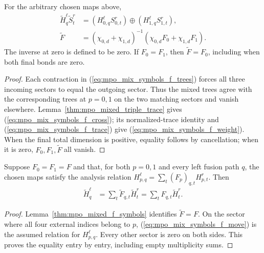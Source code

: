 \begin{lemma}
    \label{thm:mpo_mixed_f_symbols}
    \leanok
    For the arbitrary chosen maps above,
    \begin{align}
        \widetilde H^\ell_q\widetilde S^r_t
         & =(H^\ell_{0,q}S^r_{0,t})\oplus(H^\ell_{1,q}S^r_{1,t}),
        \label{eq:mpo_mix_symbols_f_cross}                        \\
        \widetilde F
         & =(\chi_{0,d}+\chi_{1,d})^{-1}
        (\chi_{0,d}F_0+\chi_{1,d}F_1).
        \label{eq:mpo_mix_symbols_f_weight}
    \end{align}
    The inverse at zero is defined to be zero. If $F_0=F_1$, then
    $\widetilde F=F_0$, including when both final bonds are zero.
\end{lemma}
\begin{proof}
    \leanok
    Each contraction in (\ref{eq:mpo_mix_symbols_f_trees}) forces
    all three incoming sectors to equal the outgoing sector. Thus
    the mixed trees agree with the corresponding trees at $p=0,1$
    on the two matching sectors and vanish elsewhere.
    Lemma~\ref{thm:mpo_mixed_triple_trace} gives
    (\ref{eq:mpo_mix_symbols_f_cross}); its normalized-trace
    identity and (\ref{eq:mpo_mix_symbols_f_trace}) give
    (\ref{eq:mpo_mix_symbols_f_weight}). When the final total
    dimension is positive, equality follows by cancellation; when it
    is zero, $F_0,F_1,\widetilde F$ all vanish.
\end{proof}

\begin{lemma}
    \label{thm:mpo_mixed_f_move}
    \leanok
    Suppose $F_0=F_1=F$ and that, for both $p=0,1$ and every left
    fusion path $q$, the chosen maps satisfy the analysis relation
    $H^\ell_{p,q}=\sum_t(F_p)_{q,t}H^r_{p,t}$. Then
    \begin{align}
        \widetilde H^\ell_q
         & =\sum_t\widetilde F_{q,t}\widetilde H^r_t
        =\sum_tF_{q,t}\widetilde H^r_t.
        \label{eq:mpo_mix_symbols_f_move}
    \end{align}
\end{lemma}
\begin{proof}
    \leanok
    Lemma~\ref{thm:mpo_mixed_f_symbols} identifies
    $\widetilde F=F$. On the sector where all four external indices
    belong to $p$, (\ref{eq:mpo_mix_symbols_f_move}) is the assumed
    relation for $H^\ell_{p,q}$. Every other sector is zero on both
    sides. This proves the equality entry by entry, including empty
    multiplicity sums.
\end{proof}


